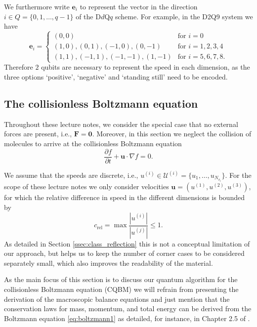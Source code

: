 We furthermore write $\mathbf{e}_i$ to represent the vector in the direction $i \in Q=\{0, 1, \dots,q-1\}$ of the D$d$Q$q$ scheme. For example, in the D2Q9 system we have
\begin{equation}
    \mathbf{e}_i = \begin{cases}
      (0,0) & \text{for $i = 0$}\\
      (1,0), (0,1), (-1,0), (0,-1) & \text{for $i = 1,2,3,4$}\\
      (1,1), (-1,1), (-1,-1), (1,-1) & \text{for $i=5,6,7,8$}.
    \end{cases}   
\end{equation}
Therefore $2$ qubits are necessary to represent the speed in each dimension, as the three options `positive', `negative' and `standing still' need to be encoded. 

\subsection{The collisionless Boltzmann equation}
Throughout these lecture notes, we consider the special case that no external forces are present, i.e., $\mathbf{F}=\mathbf{0}$. Moreover, in this section we neglect the collision of molecules to arrive at the collisionless Boltzmann equation
\begin{equation}
  \frac{\partial f}{\partial t} + \mathbf{u}\cdot \nabla f = 0.
  \label{eq:collisionless_boltzmann}
\end{equation}

We assume that the speeds are discrete, i.e., $u^{(i)}\in\mathcal{U}^{(i)}=\{u_1,\dots ,u_{N_{v_i}}\}$. For the scope of these lecture notes we only consider velocities $\mathbf{u}=(u^{(1)},u^{(2)},u^{(3)})$, for which the relative difference in speed in the different dimensions is bounded by
\begin{equation}
    c_\text{rel} = \max \frac{|u^{(i)}|}{|u^{(j)}|}\leq 1.
\end{equation}
As detailed in Section \ref{ssec:class_reflection} this is not a conceptual limitation of our approach, but helps us to keep the number of corner cases to be considered separately small, which also improves the readability of the material. %

As the main focus of this section is to discuss our quantum algorithm for the collisionless Boltzmann equation (CQBM) we will refrain from presenting the derivation of the macroscopic balance equations and just mention that the conservation laws for mass, momentum, and total energy can be derived from the Boltzmann equation \eqref{eq:boltzmann1} as detailed, for instance, in Chapter 2.5 of \cite{Kremer:2010}.

